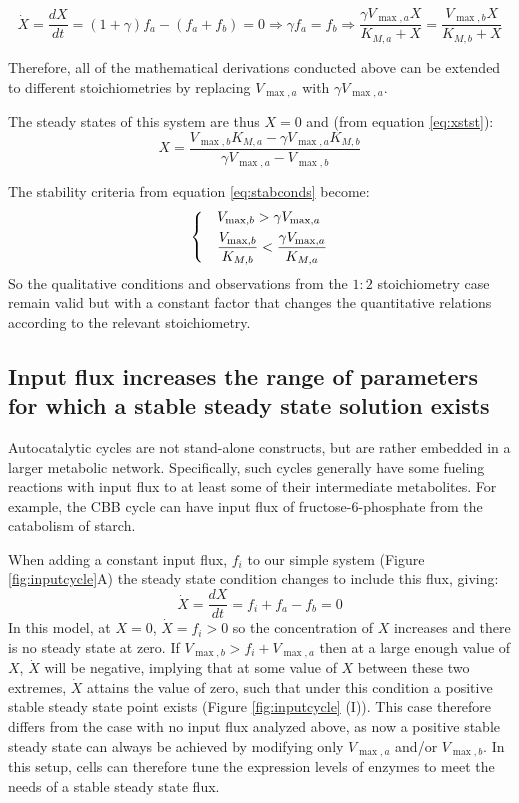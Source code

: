 \documentclass[a4page,notitlepage]{article}
\begin{document}
    \begin{equation*}
      \dot X = \frac{dX}{dt} = (1+\gamma)f_a - (f_a + f_b) = 0 \Rightarrow \gamma f_a = f_b \Rightarrow \frac{\gamma V_{\max,a}X}{K_{M,a}+X}=\frac{V_{\max,b}X}{K_{M,b}+X}
    \end{equation*}

    Therefore, all of the mathematical derivations conducted above can be extended to different stoichiometries by replacing $V_{\max,a}$ with $\gamma V_{\max,a}$.

    The steady states of this system are thus $X=0$ and (from equation \eqref{eq:xstst}):
    \begin{equation*}
      X=\frac{V_{\max,b}K_{M,a}-\gamma V_{\max,a}K_{M,b}}{\gamma V_{\max,a}-V_{\max,b}}
    \end{equation*}

    The stability criteria from equation \eqref{eq:stabconds} become:
    \begin{equation*}
    \begin{dcases}
      & V_{\max,b}>\gamma V_{\max,a} \\
      & \frac{V_{\max,b}}{K_{M,b}}<\frac{\gamma V_{\max,a}}{K_{M,a}}
    \end{dcases}
    \end{equation*}
    So the qualitative conditions and observations from the $1:2$ stoichiometry case remain valid but with a constant factor that changes the quantitative relations according to the relevant stoichiometry.

\subsection{Input flux increases the range of parameters for which a stable steady state solution exists}
    Autocatalytic cycles are not stand-alone constructs, but are rather embedded in a larger metabolic network.
    Specifically, such cycles generally have some fueling reactions with input flux to at least some of their intermediate metabolites.
    For example, the CBB cycle can have input flux of fructose-6-phosphate from the catabolism of starch.

    When adding a constant input flux, $f_i$ to our simple system (Figure \ref{fig:inputcycle}A) the steady state condition changes to include this flux, giving:
    \begin{equation*}
      \dot X = \frac{dX}{dt} = f_i + f_a - f_b = 0
    \end{equation*}
    In this model, at $X=0$, $\dot X=f_i>0$ so the concentration of $X$ increases and there is no steady state at zero.
    If $V_{\max,b}>f_i+V_{\max,a}$ then at a large enough value of $X$, $\dot X$ will be negative, implying that at some value of $X$ between these two extremes, $\dot{X}$ attains the value of zero, such that under this condition a positive stable steady state point exists (Figure \ref{fig:inputcycle} (I)).
    This case therefore differs from the case with no input flux analyzed above, as now a positive stable steady state can always be achieved by modifying only $V_{\max,a}$ and/or $V_{\max,b}$.
    In this setup, cells can therefore tune the expression levels of enzymes to meet the needs of a stable steady state flux.
\end{document}

